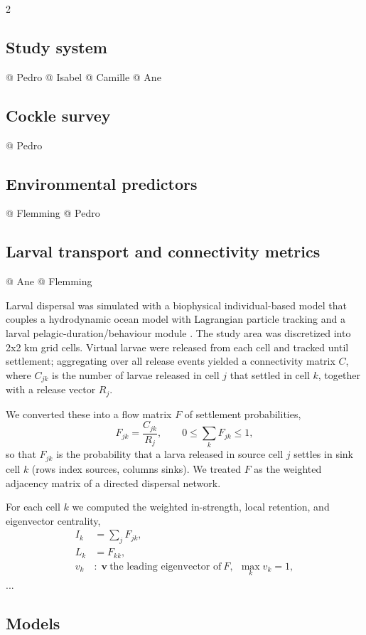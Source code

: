 \begin{spacing}{2}
\subsection{Study system}
@ Pedro
@ Isabel
@ Camille
@ Ane

\subsection{Cockle survey}
@ Pedro

\subsection{Environmental predictors}
@ Flemming
@ Pedro

\subsection{Larval transport and connectivity metrics}
@ Ane
@ Flemming


Larval dispersal was simulated with a biophysical individual-based model that
couples a hydrodynamic ocean model with Lagrangian particle tracking and a
larval pelagic-duration/behaviour module \citep{yourABMref}. The study area was
discretized into 2x2 km grid cells. Virtual larvae were released from each cell and tracked until settlement; aggregating over all release events yielded a connectivity matrix $C$, where $C_{jk}$ is the number of larvae released in cell $j$ that settled in cell $k$, together with a release vector $R_j$.

We converted these into a flow matrix $F$ of settlement probabilities,
\begin{equation}
F_{jk} = \frac{C_{jk}}{R_j}, \qquad 0 \le \sum_{k} F_{jk} \le 1,
\end{equation}
so that $F_{jk}$ is the probability that a larva released in source cell $j$
settles in sink cell $k$ (rows index sources, columns sinks). We treated $F$ as
the weighted adjacency matrix of a directed dispersal network.

For each cell $k$ we computed the weighted in-strength, local retention, and
eigenvector centrality,
\begin{align}
I_k &= \sum_{j} F_{jk}, \\
L_k &= F_{kk}, \\
v_k &: \; \mathbf{v}\ \text{the leading eigenvector of}\ F,\ \ \max_k v_k = 1,
\end{align}
...


\subsection{Models}


\end{spacing}
